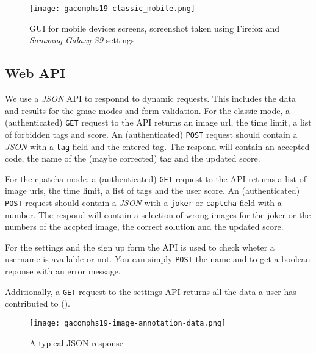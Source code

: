 \begin{figure}[!]
\centering
\texttt{[image: gacomphs19-classic\_mobile.png]}
\caption{GUI for mobile devices screens, screenshot taken using Firefox and \textit{Samsung Galaxy S9} settings}
\label{gacomphs19:fig:guiclassicmobile}
\end{figure}


\subsection{Web API}
\label{gacomphs19:sec:implementation:API}
We use a \textit{JSON} API to responnd to dynamic requests. This includes the data and results for the gmae modes and form validation.
For the classic mode, a (authenticated) \texttt{GET} request to the API returns an image url, the time limit, a list of forbidden tags and score.
An (authenticated) \texttt{POST} request should contain a \textit{JSON} with a \texttt{tag} field and the entered tag. The respond will contain an accepted code, the name of the (maybe corrected) tag and the updated score.

For the cpatcha mode, a (authenticated) \texttt{GET} request to the API returns a list of image urls, the time limit, a list of tags and the user score.
An (authenticated) \texttt{POST} request should contain a \textit{JSON} with a \texttt{joker} or \texttt{captcha} field with a number. The respond will contain a selection of wrong images for the joker or the numbers of the accpted image, the correct solution and the updated score.

For the settings and the sign up form the API is used to check wheter a username is available or not. You can simply \texttt{POST} the name and to get a boolean reponse with an error message.

Additionally, a \texttt{GET} request to the settings API returns all the data a user has contributed to ().

\begin{figure}[!]
\centering
\texttt{[image: gacomphs19-image-annotation-data.png]}
\caption{A typical JSON response}
\label{gacomphs19:fig:webapi}
\end{figure}

